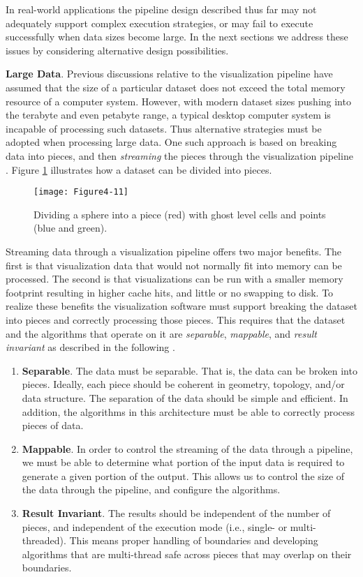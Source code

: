 In real-world applications the pipeline design described thus far may not adequately support complex execution strategies, or may fail to execute successfully when data sizes become large. In the next sections we address these issues by considering alternative design possibilities.

\textbf{Large Data}. Previous discussions relative to the visualization pipeline have assumed that the size of a particular dataset does not exceed the total memory resource of a computer system. However, with modern dataset sizes pushing into the terabyte and even petabyte range, a typical desktop computer system is incapable of processing such datasets. Thus alternative strategies must be adopted when processing large data. One such approach is based on breaking data into pieces, and then \emph{streaming} the pieces through the visualization pipeline \cite{Martin01}. Figure \ref{fig:Figure4-11} illustrates how a dataset can be divided into pieces.

\begin{figure}[!htb]
  \centering
  \texttt{[image: Figure4-11]}\\
  \caption{Dividing a sphere into a piece (red) with ghost level cells and points (blue and green).}\label{fig:Figure4-11}
\end{figure}

Streaming data through a visualization pipeline offers two major benefits. The first is that visualization data that would not normally fit into memory can be processed. The second is that visualizations can be run with a smaller memory footprint resulting in higher cache hits, and little or no swapping to disk. To realize these benefits the visualization software must support breaking the dataset into pieces and correctly processing those pieces. This requires that the dataset and the algorithms that operate on it are \emph{separable}, \emph{mappable}, and \emph{result invariant} as described in the following \cite{Law99}.

\begin{enumerate}
\item \textbf{Separable}. The data must be separable. That is, the data can be broken into pieces. Ideally, each piece should be coherent in geometry, topology, and/or data structure. The separation of the data should be simple and efficient. In addition, the algorithms in this architecture must be able to correctly process pieces of data.

\item \textbf{Mappable}. In order to control the streaming of the data through a pipeline, we must be able to determine what portion of the input data is required to generate a given portion of the output. This allows us to control the size of the data through the pipeline, and configure the algorithms.

\item \textbf{Result Invariant}. The results should be independent of the number of pieces, and independent of the execution mode (i.e., single- or multi-threaded). This means proper handling of boundaries and developing algorithms that are multi-thread safe across pieces that may overlap on their boundaries.
\end{enumerate}

